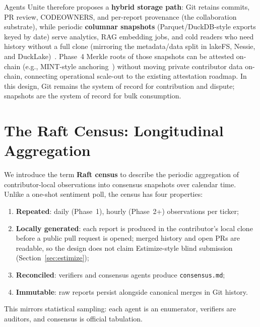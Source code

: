 \documentclass[10pt,twocolumn]{article}
\begin{document}
Agents Unite therefore proposes a \textbf{hybrid storage path}: Git retains commits, PR review, CODEOWNERS, and per-report provenance (the collaboration substrate), while periodic \textbf{columnar snapshots} (Parquet/DuckDB-style exports keyed by date) serve analytics, RAG embedding jobs, and cold readers who need history without a full clone (mirroring the metadata/data split in lakeFS, Nessie, and DuckLake)~\cite{lakefs,nessie,ducklake}. Phase~4 Merkle roots of those snapshots can be attested on-chain (e.g., MINT-style anchoring~\cite{mint}) without moving private contributor data on-chain, connecting operational scale-out to the existing attestation roadmap. In this design, Git remains the system of record for contribution and dispute; snapshots are the system of record for bulk consumption.

\section{The Raft Census: Longitudinal Aggregation}

We introduce the term \textbf{Raft census} to describe the periodic aggregation of contributor-local observations into consensus snapshots over calendar time. Unlike a one-shot sentiment poll, the census has four properties:

\begin{enumerate}[label=\arabic*.]
  \item \textbf{Repeated}: daily (Phase~1), hourly (Phase~2+) observations per ticker;
  \item \textbf{Locally generated}: each report is produced in the contributor's local clone before a public pull request is opened; merged history and open PRs are readable, so the design does not claim Estimize-style blind submission (Section~\ref{sec:estimize});
  \item \textbf{Reconciled}: verifiers and consensus agents produce \texttt{consensus.md};
  \item \textbf{Immutable}: raw reports persist alongside canonical merges in Git history.
\end{enumerate}

This mirrors statistical sampling: each agent is an enumerator, verifiers are auditors, and consensus is official tabulation.

\end{document}

